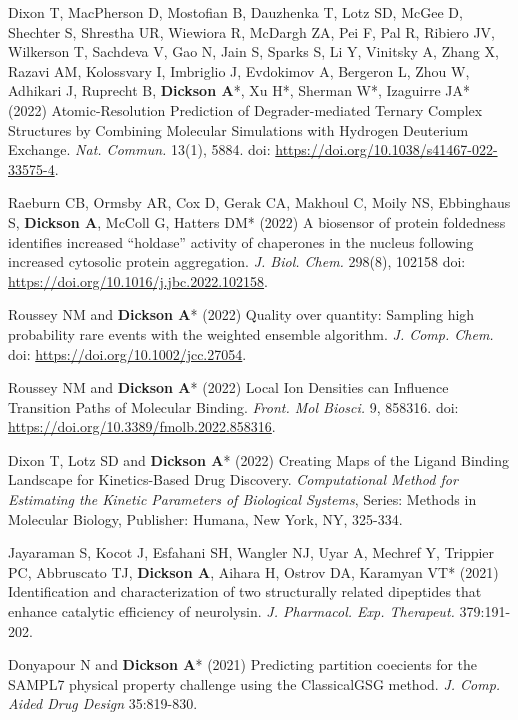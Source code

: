 \documentclass[margin,line]{res}
\begin{document}
\begin{resume}
\begin{spacing}{1.2}
\begin{thebibliography}{10}
  Dixon T, MacPherson D, Mostofian B, Dauzhenka T, Lotz SD, McGee D, Shechter S, Shrestha UR, Wiewiora R, McDargh ZA, Pei F, Pal R, Ribiero JV, Wilkerson T, Sachdeva V, Gao N, Jain S, Sparks S, Li Y, Vinitsky A, Zhang X, Razavi AM, Kolossvary I, Imbriglio J, Evdokimov A, Bergeron L, Zhou W, Adhikari J, Ruprecht B, {\bf Dickson A}*, Xu H*, Sherman W*, Izaguirre JA* (2022) Atomic-Resolution Prediction of Degrader-mediated Ternary Complex Structures by Combining Molecular Simulations with Hydrogen Deuterium Exchange.
  \newblock \textit{Nat. Commun.} 13(1), 5884. doi: \url{https://doi.org/10.1038/s41467-022-33575-4}.

Raeburn CB, Ormsby AR, Cox D, Gerak CA, Makhoul C, Moily NS, Ebbinghaus S, {\bf Dickson A}, McColl G, Hatters DM* (2022) A biosensor of protein foldedness identifies increased “holdase” activity of chaperones in the nucleus following increased cytosolic protein aggregation.
\newblock \textit{J. Biol. Chem.} 298(8), 102158 doi: \url{https://doi.org/10.1016/j.jbc.2022.102158}. 

Roussey NM and {\bf Dickson A}* (2022) Quality over quantity: Sampling high probability rare events with the weighted ensemble algorithm.
\newblock \textit{J. Comp. Chem.} doi: \url{https://doi.org/10.1002/jcc.27054}.

Roussey NM and {\bf Dickson A}* (2022) Local Ion Densities can Influence Transition Paths of Molecular Binding.
\newblock \textit{Front. Mol Biosci.} 9, 858316. doi: \url{https://doi.org/10.3389/fmolb.2022.858316}.

  Dixon T, Lotz SD and {\bf Dickson A}* (2022) Creating Maps of the Ligand Binding Landscape for Kinetics-Based Drug Discovery.
  \newblock \textit{Computational Method for Estimating the Kinetic Parameters of Biological Systems}, Series: Methods in Molecular Biology, Publisher: Humana, New York, NY, 325-334.

  Jayaraman S, Kocot J, Esfahani SH, Wangler NJ, Uyar A, Mechref Y, Trippier PC, Abbruscato TJ, {\bf Dickson A}, Aihara H, Ostrov DA, Karamyan VT* (2021) Identification and characterization of two structurally related dipeptides that enhance catalytic efficiency of neurolysin.
  \newblock \textit{J. Pharmacol. Exp. Therapeut.} 379:191-202.
  
Donyapour N and {\bf Dickson A}* (2021) Predicting partition coecients for the SAMPL7 physical property challenge using the ClassicalGSG method.
\newblock \textit{J. Comp. Aided Drug Design} 35:819-830.


\end{thebibliography}
\end{spacing}
\end{resume}
\end{document}
